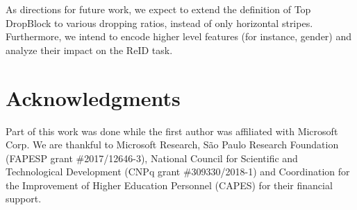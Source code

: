 \documentclass[a4paper,conference]{IEEEtran}
\begin{document}
As directions for future work, we expect to extend the definition of Top DropBlock to various dropping ratios, instead of only horizontal stripes. Furthermore, we intend to encode higher level features (for instance, gender) and analyze their impact on the ReID task.
 
\section*{Acknowledgments}
\label{acknowledgment}
 
Part of this work was done while the first author was affiliated with Microsoft Corp. We are thankful to Microsoft Research, S\~ao Paulo Research Foundation (FAPESP grant \#2017/12646-3), National Council for Scientific and Technological Development (CNPq grant \#309330/2018-1) and Coordination for the Improvement of Higher Education Personnel (CAPES) for their financial support.


\balance


 
\end{document}
